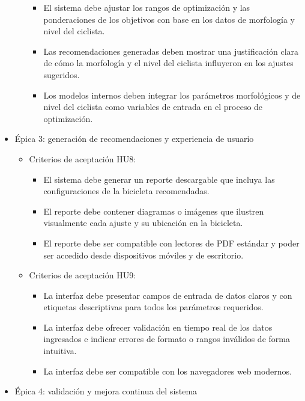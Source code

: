 \documentclass[
11pt, %
]{charter}
\begin{document}
\begin{itemize}
\begin{itemize}
        \begin{itemize}
          \item El sistema debe ajustar los rangos de optimización y las ponderaciones de los objetivos con base en los datos de morfología y nivel del ciclista.
          \item Las recomendaciones generadas deben mostrar una justificación clara de cómo la morfología y el nivel del ciclista influyeron en los ajustes sugeridos.
          \item Los modelos internos deben integrar los parámetros morfológicos y de nivel del ciclista como variables de entrada en el proceso de optimización.
        \end{itemize}
    \end{itemize}
  \item Épica 3: generación de recomendaciones y experiencia de usuario
    \begin{itemize}
      \item Criterios de aceptación HU8:
        \begin{itemize}
          \item El sistema debe generar un reporte descargable que incluya las configuraciones de la bicicleta recomendadas.
          \item El reporte debe contener diagramas o imágenes que ilustren visualmente cada ajuste y su ubicación en la bicicleta.
          \item El reporte debe ser compatible con lectores de PDF estándar y poder ser accedido desde dispositivos móviles y de escritorio.
        \end{itemize}
      \item Criterios de aceptación HU9:
        \begin{itemize}
          \item La interfaz debe presentar campos de entrada de datos claros y con etiquetas descriptivas para todos los parámetros requeridos.
          \item La interfaz debe ofrecer validación en tiempo real de los datos ingresados e indicar errores de formato o rangos inválidos de forma intuitiva.
          \item La interfaz debe ser compatible con los navegadores web modernos.
        \end{itemize}
    \end{itemize}
  \item Épica 4: validación y mejora continua del sistema
    \begin{itemize}

\end{itemize}
\end{itemize}
\end{document}
